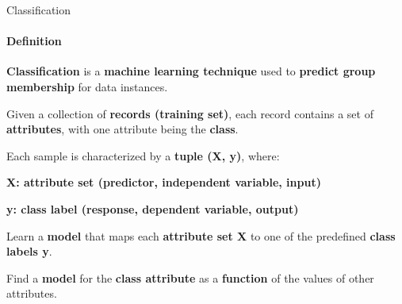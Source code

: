 \documentclass[aspectratio=169]{beamer}
\begin{document}
\begin{frame}{Classification}
    \framesubtitle{Definition}
    \small\centering\textbf{Classification} is a \textbf{machine learning technique} used to \textbf{predict group membership} for data instances.

    \vspace{.3cm}
    \begin{coloredblockicon}
        \vspace{.3cm}
        \begin{tugitemize}
            \item \scriptsize Given a collection of \textbf{records (training set)}, each record contains a set of \textbf{attributes}, with one attribute being the \textbf{class}.
            \item \scriptsize Each sample is characterized by a \textbf{tuple (X, y)}, where:
            \vspace{-.3cm}
            \begin{tugitemize}
                \item \scriptsize \textbf{X: attribute set (predictor, independent variable, input)}
                \item \scriptsize \textbf{y: class label (response, dependent variable, output)}
            \end{tugitemize}
        \end{tugitemize}
    \end{coloredblockicon}

    \begin{coloredblockicon}
        \vspace{.3cm}
        \begin{tugitemize}
            \item \scriptsize Learn a \textbf{model} that maps each \textbf{attribute set X} to one of the predefined \textbf{class labels y}.
            \item \scriptsize Find a \textbf{model} for the \textbf{class attribute} as a \textbf{function} of the values of other attributes.
        \end{tugitemize}
    \end{coloredblockicon}


\end{frame}
\end{document}
